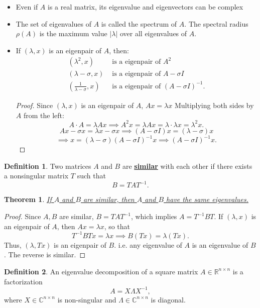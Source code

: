 \documentclass[12pt]{article}
\newtheorem{theorem}{Theorem}
\theoremstyle{definition}
\newtheorem{definition}{Definition}
\theoremstyle{remark}
\newcommand{\R}{\mathbb{R}}
\newcommand{\C}{\mathbb{C}}
\begin{document}
\begin{itemize}
		\itemsep0.3cm
				\item Even if $A$ is a real matrix, its eigenvalue and eigenvectors can be complex
				\item The set of eigenvalues of $A$ is called the spectrum of $A$. The spectral radius $\rho\left( A \right) $ is the maximum value $\left| \lambda \right| $ over all eigenvalues of $A$.
				\item If $\left(\lambda,x \right) $ is an eigenpair of $A$, then:
						\begin{align*}
								\left( \lambda^2,x \right) &\textrm{ is a eigenpair of }A^2\\
								\left( \lambda-\sigma,x \right) &\textrm{ is a eigenpair of }A-\sigma I\\
								\left( \frac{1}{\lambda-\sigma},x \right) &\textrm{ is a eigenpair of }\left( A-\sigma I \right) ^{-1}
						.\end{align*}
\begin{proof}
							Since $\left( \lambda,x \right) $ is an eigenpair of $A$, $Ax=\lambda x$ Multiplying both sides by $A$ from the left:\[
				A\cdot A=\lambda A x \implies A^2x=\lambda Ax=\lambda\cdot\lambda x=\lambda^2 x
				.\] 
				\[
						Ax-\sigma x=\lambda x-\sigma x \implies \left( A-\sigma I \right) x=\left( \lambda-\sigma\right)x\]\[\implies x=\left( \lambda-\sigma \right) \left( A-\sigma I \right) ^{-1}x\implies\left( A-\sigma I \right) ^{-1}x
				.\]		
\end{proof}
\end{itemize}
\begin{definition}
	Two matrices $A$ and $B$ are \underline{\textbf{similar}} with each other if there exists a nonsingular matrix $T$ such that \[
		B=TAT^{-1}
		.\]  
\end{definition}
\begin{theorem}
	\underline{If $A$ and $B$ are similar, then $A$ and $B$ have the same eigenvalues.}
\end{theorem}
\begin{proof}
		Since $A,B$ are similar, $B=TAT^{-1}$, which implies $A=T^{-1}BT$. If $\left( \lambda, x \right) $ is an eigenpair of $A$, then $Ax=\lambda x$, so that \[
				T^{-1}BTx=\lambda x\implies B\left( Tx \right) =\lambda\left( Tx \right) 
		.\] Thus, $\left( \lambda, Tx \right) $ is an eigenpair of $B$. i.e. any eigenvalue of $A$ is an eigenvalue of $B$. The reverse is similar.
\end{proof}
\begin{definition}
		An eigenvalue decomposition of a square matrix $A\in \R^{n\times n}$ is a factorization \[
		A=X\Lambda X^{-1}
		,\] where $X\in\C^{n\times n}$ is non-singular and $\Lambda\in\C^{n\times n}$ is diagonal.
\end{definition}
\end{document}
